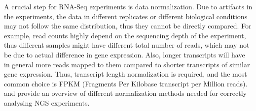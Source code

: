 A crucial step for RNA-Seq experiments is data normalization. Due to artifacts in the experiments, the data in different replicates or different biological conditions may not follow the same distribution, thus they cannot be directly compared. For example, read counts highly depend on the sequencing depth of the experiment, thus different samples might have different total number of reads, which may not be due to actual difference in gene expression. Also, longer transcripts will have in general more reads mapped to them compared to shorter transcripts of similar gene expression. Thus, transcript length normalization is required, and the most common choice is FPKM (Fragments Per Kilobase transcript per Million reads). \citet{Robinson2010} and \citet{Aleksic2014} provide an overview of different normalization methods needed for correctly analysing NGS experiments.
